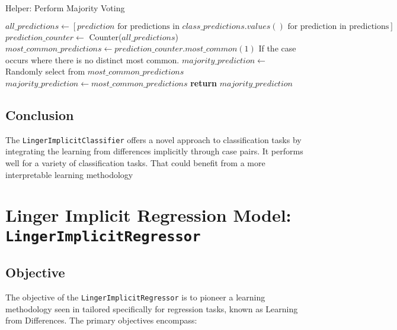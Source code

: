 \documentclass[a4paper, 12pt]{report}
\begin{document}
\begin{algorithm}[H]
    \caption{Helper: Perform Majority Voting}
    \label{alg:majority_vote}
    \begin{algorithmic}[1]
            \State $all\_predictions \gets [prediction \text{ for predictions in } class\_predictions.values() \text{ for prediction in predictions}]$
            \State $prediction\_counter \gets$ Counter($all\_predictions$)
            \State $most\_common\_predictions \gets prediction\_counter.most\_common(1)$
            \State If the case occurs where there is no distinct most common.
                \State $majority\_prediction \gets$ Randomly select from $most\_common\_predictions$
            \Else
                \State $majority\_prediction \gets most\_common\_predictions$
            \EndIf
            \State \textbf{return} $majority\_prediction$
        \EndFunction
    \end{algorithmic}
\end{algorithm}

\subsection{Conclusion}
The \texttt{LingerImplicitClassifier} offers a novel approach to classification tasks by integrating the learning from differences implicitly through case pairs. 
It performs well for a variety of classification tasks. 
That could benefit from a more interpretable learning methodology 

\section{Linger Implicit Regression Model: \texttt{LingerImplicitRegressor}}
\label{sec:lingerImplicit_regression_base_model}
\subsection{Objective}
The objective of the \texttt{LingerImplicitRegressor} is to pioneer a learning methodology seen in \cite{ye2021learning} tailored specifically for regression tasks, known as Learning from Differences. The primary objectives encompass:
\end{document}
